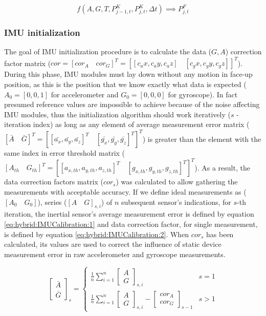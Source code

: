 \documentclass[sensors,article,submit,moreauthors,pdftex,10pt,a4paper]{mdpi}
\begin{document}
\begin{equation}
	f(A,G,T,P_{j-1,t}^K,P_{j,t}^K,\Delta t)\implies P_{j,t}^F
	\label{eq:fusion:formula}
\end{equation}

\subsubsection{IMU initialization}
The goal of IMU initialization procedure is to calculate the data ($G, A$) correction factor matrix ($cor = [cor_A \quad cor_G]^T = [[c_ax,c_ay,c_az ]\quad[c_gx,c_gy,c_gz ]]^T $). During this phase, IMU modules must lay down without any motion in face-up position, as this is the position that we know exactly what data is expected ($A_0=[0,0,1]$ for accelerometer and $G_0=[0,0,0]$ for gyroscope). In fact presumed reference values are impossible to achieve because of the noise affecting IMU modules, thus the initialization algorithm should work iteratively ($s$ - iteration index) as long as any element of average measurement error matrix ($[\bar{A}\quad \bar{G}]^T = [[\bar{a_x},\bar{a_y},\bar{a_z}]^T\quad[\bar{g_x},\bar{g_y},\bar{g_z}]^T]^T$) is greater than the element with the same index in error threshold matrix ($[A_{th}\quad G_{th}]^T = [[a_{x,th},a_{y,th},a_{z,th}]^T\quad[g_{x,th},g_{y,th},g_{z,th}]^T]^T $). As a result, the data correction factors matrix ($cor_s$) was calculated to allow gathering the measurements with acceptable accuracy. If we define ideal measurements as ($[A_0\quad G_0]$), series ($[A\quad G]_{s,i}$) of $n$ subsequent sensor’s indications, for $s$-th iteration, the inertial sensor’s average measurement error is defined by equation \ref{eq:hybrid:IMUCalibration:1} and data correction factor, for single measurement, is defined by equation \ref{eq:hybrid:IMUCalibration:2}. When $cor_s$ has been calculated, its values are used to correct the influence of static device measurement error in raw accelerometer and gyroscope measurements.

\begin{equation}
	\begin{bmatrix} \bar{A} \\ \bar{G} \end{bmatrix}_s =
	\begin{cases}
		\frac{1}{n}\sum_{i=1}^{n}{\begin{bmatrix}A \\ G\end{bmatrix}_{s,i}} & s = 1\\
		\frac{1}{n}\sum_{i=1}^{n}{\begin{bmatrix}A \\ G\end{bmatrix}_{s,i} - \begin{bmatrix}cor_A\\ cor_G\end{bmatrix}_{s-1}} &  s > 1
	\end{cases}
	\label{eq:hybrid:IMUCalibration:1}
\end{equation}
\end{document}
